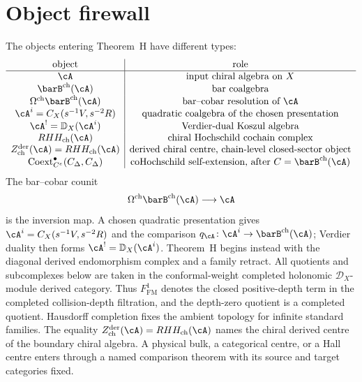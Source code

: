 \section{Object firewall}
\label{sec:theorem-h-object-firewall}

The objects entering Theorem~H have different types:
\[
\begin{array}{c|c}
\text{object} & \text{role}\\
\hline
\cA & \text{input chiral algebra on }X\\
\barB^{\mathrm{ch}}(\cA) & \text{bar coalgebra}\\
\Omega^{\mathrm{ch}}\barB^{\mathrm{ch}}(\cA) &
 \text{bar--cobar resolution of }\cA\\
\cA^{i}=C_X(s^{-1}V,s^{-2}R) &
 \text{quadratic coalgebra of the chosen presentation}\\
\cA^!=\mathbb D_X(\cA^i) &
 \text{Verdier-dual Koszul algebra}\\
RHH_{\mathrm{ch}}(\cA) &
 \text{chiral Hochschild cochain complex}\\
Z^{\mathrm{der}}_{\mathrm{ch}}(\cA)=RHH_{\mathrm{ch}}(\cA) &
 \text{derived chiral centre, chain-level closed-sector object}\\
\mathrm{Coext}_{C^e}^{\bullet}(C_\Delta,C_\Delta) &
 \text{coHochschild self-extension, after }C=\barB^{\mathrm{ch}}(\cA)
\end{array}
\]
The bar--cobar counit
\[
 \Omega^{\mathrm{ch}}\barB^{\mathrm{ch}}(\cA)\longrightarrow \cA
\]
is the inversion map.  A chosen quadratic presentation gives
$\cA^i=C_X(s^{-1}V,s^{-2}R)$ and the comparison
$q_\cA\colon\cA^i\to\barB^{\mathrm{ch}}(\cA)$; Verdier duality then
forms $\cA^!=\mathbb D_X(\cA^i)$.  Theorem~H begins instead with the
diagonal derived endomorphism complex and a family retract.
All quotients and subcomplexes below are taken in the conformal-weight
completed holonomic $\mathcal D_X$-module derived category. Thus
$F^1_{\mathrm{FM}}$ denotes the closed positive-depth term in the
completed collision-depth filtration, and the depth-zero quotient is a
completed quotient.  Hausdorff completion fixes the ambient topology
for infinite standard families.
The equality
$Z^{\mathrm{der}}_{\mathrm{ch}}(\cA)=RHH_{\mathrm{ch}}(\cA)$ names the
chiral derived centre of the boundary chiral algebra.  A physical
bulk, a categorical centre, or a Hall centre enters through a named
comparison theorem with its source and target categories fixed.


